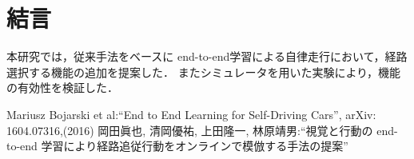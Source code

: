 \documentclass[10pt]{jarticle}
\begin{document}
    \section{結\hspace{2zw}言}%
    本研究では，従来手法をベースに
    end-to-end学習による自律走行において，経路選択する機能の追加を提案した．
    またシミュレータを用いた実験により，機能の有効性を検証した．

    \vspace{5truemm}
    {\footnotesize
   
        \begin{thebibliography}{99}
            
            Mariusz Bojarski et al:``End to End Learning for Self-Driving Cars'',
            arXiv: 1604.07316,(2016)
            岡田眞也, 清岡優祐, 上田隆一, 林原靖男:``視覚と行動の end-to-end 
            学習により経路追従行動をオンラインで模倣する手法の提案''
        \end{thebibliography}
    }
    
    \normalsize
    
\end{document}
